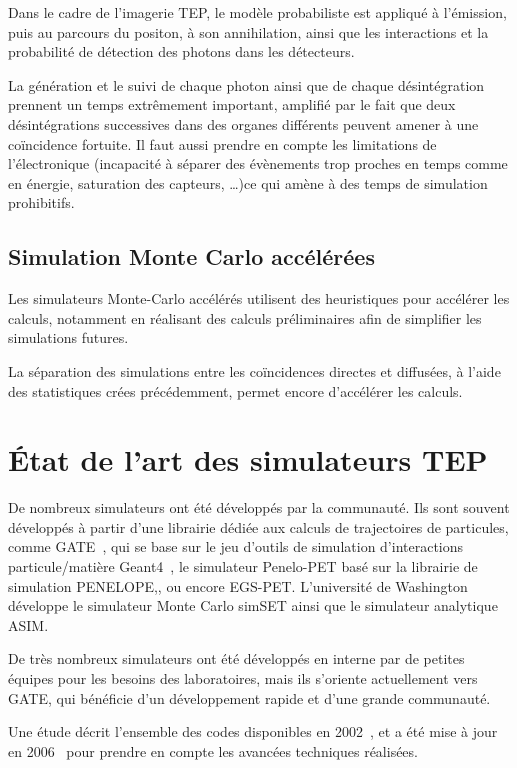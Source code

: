 Dans le cadre de l'imagerie TEP, le modèle probabiliste est appliqué à l'émission, puis au parcours du positon, à son annihilation, ainsi que les interactions et la probabilité de détection des photons dans les détecteurs.

La génération et le suivi de chaque photon ainsi que de chaque désintégration prennent un temps extrêmement important, amplifié par le fait que deux désintégrations successives dans des organes différents peuvent amener à une coïncidence fortuite. Il faut aussi prendre en compte les limitations de l'électronique (incapacité à séparer des évènements trop proches en temps comme en énergie, saturation des capteurs, \dots)ce qui amène à des temps de simulation prohibitifs.

		\subsection{Simulation Monte Carlo accélérées}

Les simulateurs Monte-Carlo accélérés utilisent des heuristiques pour accélérer les calculs, notamment en réalisant des calculs préliminaires afin de simplifier les simulations futures. 

La séparation des simulations entre les coïncidences directes et diffusées, à l’aide des statistiques crées précédemment, permet encore d’accélérer les calculs.

	\section{\'Etat de l'art des simulateurs TEP}

De nombreux simulateurs ont été développés par la communauté. Ils sont souvent développés à partir d'une librairie dédiée aux calculs de trajectoires de particules, comme GATE~\cite{jan2004gate}, qui se base sur le jeu d'outils de simulation d'interactions particule/matière Geant4~\cite{allison2006geant4}, le simulateur Penelo-PET\cite{espana2009penelopet} basé sur la librairie de simulation  PENELOPE,\cite{salvat2006penelope}, ou encore EGS-PET. L’université de Washington développe le simulateur Monte Carlo simSET ainsi que le simulateur analytique ASIM. 

De très nombreux simulateurs ont été développés en interne par de petites équipes pour les besoins des laboratoires, mais ils s'oriente actuellement  vers GATE, qui bénéficie d'un développement rapide et d'une grande communauté.

Une étude décrit l'ensemble des codes disponibles en 2002~\cite{buvat2002monte}, et a été mise à jour en 2006~\cite{buvat2002monte} pour prendre en compte les avancées techniques réalisées.

